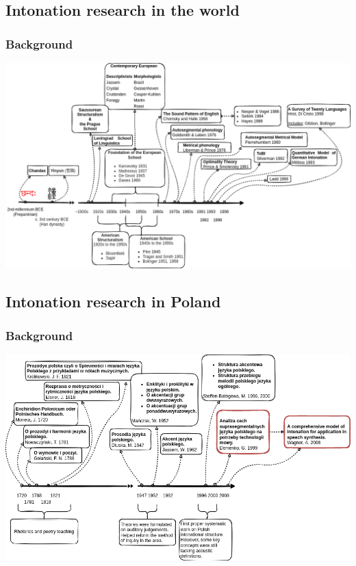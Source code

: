 \documentclass[a4paper,9pt]{beamer}
\theoremstyle{mytheoremstyle}
\begin{document}


\subsection{Intonation research in the world}
\begin{frame}
\frametitle{Background}
\includegraphics[width=\textwidth]{res/background.png}
\end{frame}

\subsection{Intonation research in Poland}
\begin{frame}
\frametitle{Background}
\includegraphics[width=\textwidth]{res/intonation_background_pl.png}
\end{frame}
\end{document}
